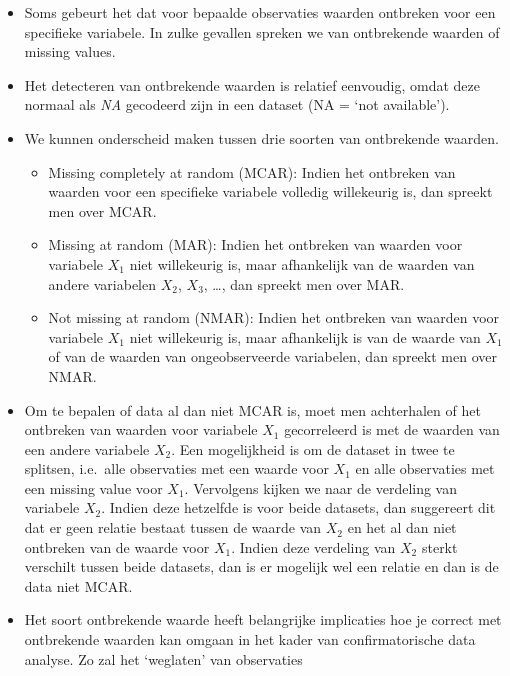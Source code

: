 \documentclass[]{memoir}
\providecommand{\tightlist}{%
  \setlength{\itemsep}{0pt}\setlength{\parskip}{0pt}}
\begin{document}
\begin{itemize}
\tightlist
\item
  Soms gebeurt het dat voor bepaalde observaties waarden ontbreken voor
  een specifieke variabele. In zulke gevallen spreken we van ontbrekende
  waarden of missing values.
\item
  Het detecteren van ontbrekende waarden is relatief eenvoudig, omdat
  deze normaal als \emph{NA} gecodeerd zijn in een dataset (NA = `not
  available').
\item
  We kunnen onderscheid maken tussen drie soorten van ontbrekende
  waarden.

  \begin{itemize}
  \tightlist
  \item
    Missing completely at random (MCAR): Indien het ontbreken van
    waarden voor een specifieke variabele volledig willekeurig is, dan
    spreekt men over MCAR.
  \item
    Missing at random (MAR): Indien het ontbreken van waarden voor
    variabele \(X_1\) niet willekeurig is, maar afhankelijk van de
    waarden van andere variabelen \(X_2\), \(X_3\), \ldots{}, dan
    spreekt men over MAR.
  \item
    Not missing at random (NMAR): Indien het ontbreken van waarden voor
    variabele \(X_1\) niet willekeurig is, maar afhankelijk is van de
    waarde van \(X_1\) of van de waarden van ongeobserveerde variabelen,
    dan spreekt men over NMAR.
  \end{itemize}
\item
  Om te bepalen of data al dan niet MCAR is, moet men achterhalen of het
  ontbreken van waarden voor variabele \(X_1\) gecorreleerd is met de
  waarden van een andere variabele \(X_2\). Een mogelijkheid is om de
  dataset in twee te splitsen, i.e.~alle observaties met een waarde voor
  \(X_1\) en alle observaties met een missing value voor \(X_1\).
  Vervolgens kijken we naar de verdeling van variabele \(X_2\). Indien
  deze hetzelfde is voor beide datasets, dan suggereert dit dat er geen
  relatie bestaat tussen de waarde van \(X_2\) en het al dan niet
  ontbreken van de waarde voor \(X_1\). Indien deze verdeling van
  \(X_2\) sterkt verschilt tussen beide datasets, dan is er mogelijk wel
  een relatie en dan is de data niet MCAR.\\
\item
  Het soort ontbrekende waarde heeft belangrijke implicaties hoe je
  correct met ontbrekende waarden kan omgaan in het kader van
  confirmatorische data analyse. Zo zal het `weglaten' van observaties

\end{itemize}
\end{document}
